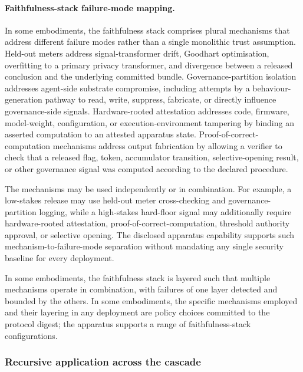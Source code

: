\documentclass[a4paper,12pt]{article}
\begin{document}
\paragraph{Faithfulness-stack failure-mode mapping.}
In some embodiments, the faithfulness stack comprises plural mechanisms
that address different failure modes rather than a single monolithic
trust assumption. Held-out meters address signal-transformer drift,
Goodhart optimisation, overfitting to a primary privacy transformer,
and divergence between a released conclusion and the underlying
committed bundle. Governance-partition isolation addresses agent-side
substrate compromise, including attempts by a behaviour-generation
pathway to read, write, suppress, fabricate, or directly influence
governance-side signals. Hardware-rooted attestation addresses code,
firmware, model-weight, configuration, or execution-environment
tampering by binding an asserted computation to an attested apparatus
state. Proof-of-correct-computation mechanisms address output
fabrication by allowing a verifier to check that a released flag,
token, accumulator transition, selective-opening result, or other
governance signal was computed according to the declared procedure.

The mechanisms may be used independently or in combination. For
example, a low-stakes release may use held-out meter cross-checking
and governance-partition logging, while a high-stakes hard-floor
signal may additionally require hardware-rooted attestation,
proof-of-correct-computation, threshold authority approval, or
selective opening. The disclosed apparatus capability supports such
mechanism-to-failure-mode separation without mandating any single
security baseline for every deployment.

In some embodiments, the faithfulness stack is layered such that
multiple mechanisms operate in combination, with failures of one
layer detected and bounded by the others. In some embodiments, the
specific mechanisms employed and their layering in any deployment
are policy choices committed to the protocol digest; the apparatus
supports a range of faithfulness-stack configurations.

\subsubsection{Recursive application across the cascade}
\label{sec:privacy-cascade}
\end{document}
